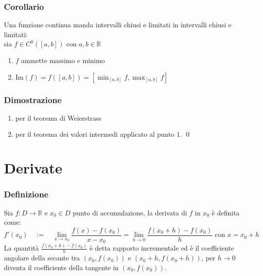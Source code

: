 \documentclass[a4paper]{article}
\newcommand\cont[2]{C^{#1} \left({#2}\right)}
\begin{document}
\subsubsection*{Corollario}
Una funzione continua manda intervalli chiusi e limitati in intervalli chiusi e limitati: \\
sia \(f \in \cont{0}{\left[a, b\right]}\) con \(a, b \in \mathbb{R}\)
\begin{enumerate}
	\item \(f\) ammette massimo e minimo
	\item \(\displaystyle \text{Im}(f) = f(\left[a, b\right]) = \left[\min_{\left[a, b\right]} f, \max_{\left[a, b\right]} f\right]\)
\end{enumerate}

\subsubsection*{Dimostrazione}
\begin{enumerate}
	\item per il teorema di Weierstrass
	\item per il teorema dei valori intermedi applicato al punto 1. \qed
\end{enumerate}

\newpage


\section{Derivate}
\subsubsection*{Definizione}
Sia \(f:D \to \mathbb{R}\) e \(x_0 \in D\) punto di accumulazione, la derivata di \(f\) in \(x_0\) è definita come:
\[f'(x_0) \quad := \quad \lim_{x \to x_0} \frac{f(x) - f(x_0)}{x - x_0} = \lim_{h \to 0} \frac{f(x_0 + h) - f(x_0)}{h} \text{ con } x = x_0 + h\]
La quantità \(\displaystyle \frac{f(x_0 + h) - f(x_0)}{h}\) è detta rapporto incrementale ed è il coefficiente angolare della secante tra
\(\left(x_0, f(x_0)\right)\) e \(\left(x_0 + h, f(x_0 + h)\right)\), per \(h \to 0\) diventa il coefficiente della tangente in \(\left(x_0, f(x_0)\right)\).
\end{document}
